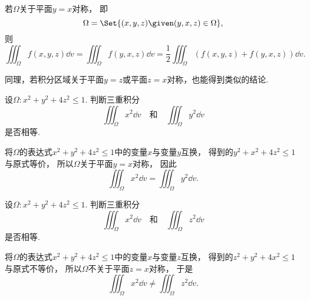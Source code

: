 若\(\Omega\)关于平面\(y=x\)对称，
即\begin{equation*}
	\Omega = \Set{ (x,y,z) \given (y,x,z) \in \Omega },
\end{equation*}
则\begin{equation*}
	\iiint_\Omega f(x,y,z) \dd{v}
	= \iiint_\Omega f(y,x,z) \dd{v}
	= \frac12 \iiint_\Omega (f(x,y,z) + f(y,x,z)) \dd{v}.
\end{equation*}

同理，若积分区域关于平面\(y=z\)或平面\(z=x\)对称，也能得到类似的结论.

\begin{example}
设\(\Omega: x^2+y^2+4z^2\leq1\).
判断三重积分\begin{equation*}
	\iiint_\Omega x^2 \dd{v}
	\quad\text{和}\quad
	\iiint_\Omega y^2 \dd{v}
\end{equation*}是否相等.
\begin{solution}
将\(\Omega\)的表达式\(x^2+y^2+4z^2\leq1\)中的变量\(x\)与变量\(y\)互换，
得到的\(y^2+x^2+4z^2\leq1\)与原式等价，
所以\(\Omega\)关于平面\(y=x\)对称，
因此\begin{equation*}
	\iiint_\Omega x^2 \dd{v}
	= \iiint_\Omega y^2 \dd{v}.
\end{equation*}
\end{solution}
\end{example}

\begin{example}
设\(\Omega: x^2+y^2+4z^2\leq1\).
判断三重积分\begin{equation*}
	\iiint_\Omega x^2 \dd{v}
	\quad\text{和}\quad
	\iiint_\Omega z^2 \dd{v}
\end{equation*}是否相等.
\begin{solution}
将\(\Omega\)的表达式\(x^2+y^2+4z^2\leq1\)中的变量\(x\)与变量\(z\)互换，
得到的\(z^2+y^2+4x^2\leq1\)与原式不等价，
所以\(\Omega\)不关于平面\(z=x\)对称，
于是\begin{equation*}
	\iiint_\Omega x^2 \dd{v}
	\neq \iiint_\Omega z^2 \dd{v}.
\end{equation*}
\end{solution}
\end{example}

